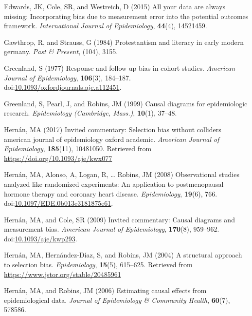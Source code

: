 \documentclass[
  singlecolumn]{article}
\newlength{\cslhangindent}
\newlength{\cslentryspacingunit} %
\newenvironment{CSLReferences}[2] %
 {%
  \setlength{\parindent}{0pt}
  \ifodd #1
  \let\oldpar\par
  \def\par{\hangindent=\cslhangindent\oldpar}
  \fi
  \setlength{\parskip}{#2\cslentryspacingunit}
 }%
 {}
\begin{document}
\begin{CSLReferences}{1}{0}
\leavevmode{}%
Edwards, JK, Cole, SR, and Westreich, D (2015) All your data are always
missing: Incorporating bias due to measurement error into the potential
outcomes framework. \emph{International Journal of Epidemiology},
\textbf{44}(4), 14521459.

\leavevmode{}%
Gawthrop, R, and Strauss, G (1984) Protestantism and literacy in early
modern germany. \emph{Past \& Present}, (104), 3155.

\leavevmode{}%
Greenland, S (1977) Response and follow-up bias in cohort studies.
\emph{American Journal of Epidemiology}, \textbf{106}(3), 184--187.
doi:\href{https://doi.org/10.1093/oxfordjournals.aje.a112451}{10.1093/oxfordjournals.aje.a112451}.

\leavevmode{}%
Greenland, S, Pearl, J, and Robins, JM (1999) Causal diagrams for
epidemiologic research. \emph{Epidemiology (Cambridge, Mass.)},
\textbf{10}(1), 37--48.

\leavevmode{}%
Hernán, MA (2017) Invited commentary: Selection bias without colliders
\textbar{} american journal of epidemiology \textbar{} oxford academic.
\emph{American Journal of Epidemiology}, \textbf{185}(11), 10481050.
Retrieved from \url{https://doi.org/10.1093/aje/kwx077}

\leavevmode{}%
Hernán, MA, Alonso, A, Logan, R, \ldots{} Robins, JM (2008)
Observational studies analyzed like randomized experiments: An
application to postmenopausal hormone therapy and coronary heart
disease. \emph{Epidemiology}, \textbf{19}(6), 766.
doi:\href{https://doi.org/10.1097/EDE.0b013e3181875e61}{10.1097/EDE.0b013e3181875e61}.

\leavevmode{}%
Hernán, MA, and Cole, SR (2009) Invited commentary: Causal diagrams and
measurement bias. \emph{American Journal of Epidemiology},
\textbf{170}(8), 959--962.
doi:\href{https://doi.org/10.1093/aje/kwp293}{10.1093/aje/kwp293}.

\leavevmode{}%
Hernán, MA, Hernández-Díaz, S, and Robins, JM (2004) A structural
approach to selection bias. \emph{Epidemiology}, \textbf{15}(5),
615--625. Retrieved from \url{https://www.jstor.org/stable/20485961}

\leavevmode{}%
Hernán, MA, and Robins, JM (2006) Estimating causal effects from
epidemiological data. \emph{Journal of Epidemiology \& Community
Health}, \textbf{60}(7), 578586.


\end{CSLReferences}
\end{document}
